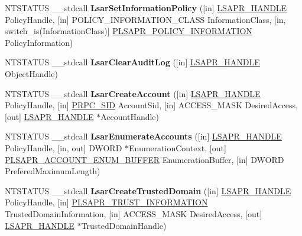 \begin{DoxyCompactItemize}
\item 
\mbox{\label{interfacelsarpc_a899b42054450769c748b2113fadd1d72}} 
N\+T\+S\+T\+A\+T\+US \+\_\+\+\_\+stdcall {\bfseries Lsar\+Set\+Information\+Policy} (\mbox{[}in\mbox{]} \hyperlink{interfacevoid}{L\+S\+A\+P\+R\+\_\+\+H\+A\+N\+D\+LE} Policy\+Handle, \mbox{[}in\mbox{]} P\+O\+L\+I\+C\+Y\+\_\+\+I\+N\+F\+O\+R\+M\+A\+T\+I\+O\+N\+\_\+\+C\+L\+A\+SS Information\+Class, \mbox{[}in, switch\+\_\+is(Information\+Class)\mbox{]} \hyperlink{union___l_s_a_p_r___p_o_l_i_c_y___i_n_f_o_r_m_a_t_i_o_n}{P\+L\+S\+A\+P\+R\+\_\+\+P\+O\+L\+I\+C\+Y\+\_\+\+I\+N\+F\+O\+R\+M\+A\+T\+I\+ON} Policy\+Information)
\item 
\mbox{\label{interfacelsarpc_aa94926aee1749a7125d9cd7eae109f49}} 
N\+T\+S\+T\+A\+T\+US \+\_\+\+\_\+stdcall {\bfseries Lsar\+Clear\+Audit\+Log} (\mbox{[}in\mbox{]} \hyperlink{interfacevoid}{L\+S\+A\+P\+R\+\_\+\+H\+A\+N\+D\+LE} Object\+Handle)
\item 
\mbox{\label{interfacelsarpc_a0051dfe81b92974c25b545aa6e7311ff}} 
N\+T\+S\+T\+A\+T\+US \+\_\+\+\_\+stdcall {\bfseries Lsar\+Create\+Account} (\mbox{[}in\mbox{]} \hyperlink{interfacevoid}{L\+S\+A\+P\+R\+\_\+\+H\+A\+N\+D\+LE} Policy\+Handle, \mbox{[}in\mbox{]} \hyperlink{struct___r_p_c___s_i_d}{P\+R\+P\+C\+\_\+\+S\+ID} Account\+Sid, \mbox{[}in\mbox{]} A\+C\+C\+E\+S\+S\+\_\+\+M\+A\+SK Desired\+Access, \mbox{[}out\mbox{]} \hyperlink{interfacevoid}{L\+S\+A\+P\+R\+\_\+\+H\+A\+N\+D\+LE} $\ast$Account\+Handle)
\item 
\mbox{\label{interfacelsarpc_acb75d705b7862fa3a3ba11a9fbdbd763}} 
N\+T\+S\+T\+A\+T\+US \+\_\+\+\_\+stdcall {\bfseries Lsar\+Enumerate\+Accounts} (\mbox{[}in\mbox{]} \hyperlink{interfacevoid}{L\+S\+A\+P\+R\+\_\+\+H\+A\+N\+D\+LE} Policy\+Handle, \mbox{[}in, out\mbox{]} D\+W\+O\+RD $\ast$Enumeration\+Context, \mbox{[}out\mbox{]} \hyperlink{struct___l_s_a_p_r___a_c_c_o_u_n_t___e_n_u_m___b_u_f_f_e_r}{P\+L\+S\+A\+P\+R\+\_\+\+A\+C\+C\+O\+U\+N\+T\+\_\+\+E\+N\+U\+M\+\_\+\+B\+U\+F\+F\+ER} Enumeration\+Buffer, \mbox{[}in\mbox{]} D\+W\+O\+RD Prefered\+Maximum\+Length)
\item 
\mbox{\label{interfacelsarpc_a4865ef8051f291caaa84c5da8df20521}} 
N\+T\+S\+T\+A\+T\+US \+\_\+\+\_\+stdcall {\bfseries Lsar\+Create\+Trusted\+Domain} (\mbox{[}in\mbox{]} \hyperlink{interfacevoid}{L\+S\+A\+P\+R\+\_\+\+H\+A\+N\+D\+LE} Policy\+Handle, \mbox{[}in\mbox{]} \hyperlink{struct___l_s_a_p_r___t_r_u_s_t___i_n_f_o_r_m_a_t_i_o_n}{P\+L\+S\+A\+P\+R\+\_\+\+T\+R\+U\+S\+T\+\_\+\+I\+N\+F\+O\+R\+M\+A\+T\+I\+ON} Trusted\+Domain\+Information, \mbox{[}in\mbox{]} A\+C\+C\+E\+S\+S\+\_\+\+M\+A\+SK Desired\+Access, \mbox{[}out\mbox{]} \hyperlink{interfacevoid}{L\+S\+A\+P\+R\+\_\+\+H\+A\+N\+D\+LE} $\ast$Trusted\+Domain\+Handle)

\end{DoxyCompactItemize}
